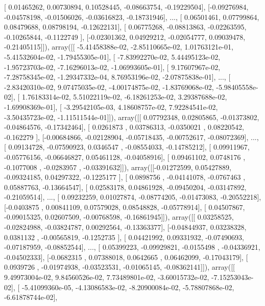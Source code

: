 \documentclass{article}
\begin{document}
       [ 0.01465262,  0.00730894,  0.10528445, -0.08663754, -0.19229504],
       [-0.09276984, -0.04578198, -0.01506026, -0.03616823, -0.18731946],
       ..., 
       [ 0.06501461,  0.07799864,  0.08479688,  0.08798194, -0.12622131],
       [ 0.06775268, -0.08813863, -0.02263595, -0.10265844, -0.1122749 ],
       [-0.02301362,  0.04929212, -0.02054777,  0.09039478, -0.21405115]]), array([[ -5.41458388e-02,  -2.85110665e-02,   1.01763121e-01,
         -5.41532604e-02,  -1.79455305e-01],
       [ -7.83992270e-02,   5.44495123e-02,  -1.95723703e-02,
         -7.16296013e-02,  -1.06993605e-01],
       [  9.17607967e-02,  -7.28758345e-02,  -1.29347332e-04,
          8.76953196e-02,  -2.07875838e-01],
       ..., 
       [ -2.83420310e-02,   9.07475035e-02,  -4.00174875e-02,
         -1.83769068e-02,  -5.98405558e-02],
       [  1.76183314e-02,   5.51022119e-02,  -6.18261253e-02,
          3.29387688e-02,  -1.69908369e-01],
       [ -3.29542105e-03,   4.18608757e-02,   7.92284541e-02,
         -3.50435723e-02,  -1.11511544e-01]]), array([[ 0.07792348,  0.02805865, -0.01373802, -0.04864576, -0.17342464],
       [ 0.0261873 ,  0.03786313, -0.0350021 ,  0.08220542, -0.162279  ],
       [-0.00684866, -0.02128904, -0.05718435, -0.00752617, -0.08072369],
       ..., 
       [ 0.09134728, -0.07590923,  0.0346547 , -0.08554033, -0.14785212],
       [ 0.09911967, -0.05776156, -0.06646827,  0.05461128, -0.04058916],
       [ 0.09461102,  0.0748176 , -0.1077008 , -0.0283957 , -0.03391632]]), array([[-0.01272599,  0.05427889, -0.09324185,  0.04297322, -0.1225177 ],
       [ 0.0898756 , -0.04141078, -0.0767463 ,  0.05887763, -0.13664547],
       [ 0.02583178,  0.04861928, -0.09450204, -0.03147892, -0.21059514],
       ..., 
       [ 0.09232259,  0.01027874, -0.08774205, -0.01473083, -0.20552218],
       [-0.0403875 ,  0.00841109,  0.07579028,  0.08548828, -0.05778914],
       [ 0.04507867, -0.09015325,  0.02607509, -0.00768598, -0.16861945]]), array([[ 0.03258525, -0.02824988, -0.03824787,  0.00292564, -0.13363377],
       [-0.04844937,  0.03238328,  0.0381132 , -0.00565819, -0.1252735 ],
       [ 0.04421992,  0.09331932, -0.07490693, -0.07187959, -0.08852544],
       ..., 
       [ 0.05399223, -0.09929821, -0.0155498 , -0.04336921, -0.04502333],
       [-0.0682315 ,  0.07388018,  0.0642665 ,  0.06462099, -0.17043179],
       [ 0.0939726 , -0.01974938, -0.03523531, -0.01065145, -0.08362141]]), array([[  9.49973004e-02,   9.84560526e-02,   7.73489801e-02,
         -3.60015732e-02,  -7.15253043e-02],
       [ -5.41099360e-05,  -4.13086583e-02,  -8.20900084e-02,
         -5.78807868e-02,  -6.61878744e-02],
\end{document}
